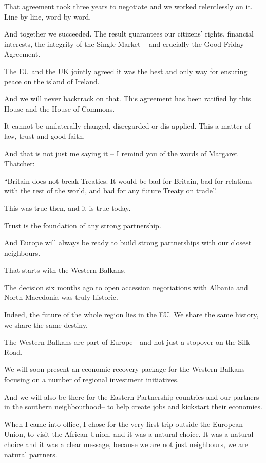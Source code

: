\documentclass[a4paper,11pt]{article}
\begin{document}
That agreement took three years to negotiate and we worked relentlessly on it. Line by line, word by word.

And together we succeeded. The result guarantees our citizens' rights, financial interests, the integrity of the Single Market – and crucially the Good Friday Agreement.

The EU and the UK jointly agreed it was the best and only way for ensuring peace on the island of Ireland.

And we will never backtrack on that. This agreement has been ratified by this House and the House of Commons.

It cannot be unilaterally changed, disregarded or dis-applied. This a matter of law, trust and good faith.

And that is not just me saying it – I remind you of the words of Margaret Thatcher:

“Britain does not break Treaties. It would be bad for Britain, bad for relations with the rest of the world, and bad for any future Treaty on trade”.

This was true then, and it is true today.

Trust is the foundation of any strong partnership.

And Europe will always be ready to build strong partnerships with our closest neighbours. 

That starts with the Western Balkans.

The decision six months ago to open accession negotiations with Albania and North Macedonia was truly historic.

Indeed, the future of the whole region lies in the EU. We share the same history, we share the same destiny.

The Western Balkans are part of Europe - and not just a stopover on the Silk Road. 

We will soon present an economic recovery package for the Western Balkans focusing on a number of regional investment initiatives.

And we will also be there for the Eastern Partnership countries and our partners in the southern neighbourhood– to help create jobs and kickstart their economies.

When I came into office, I chose for the very first trip outside the European Union, to visit the African Union, and it was a natural choice. It was a natural choice and it was a clear message, because we are not just neighbours, we are natural partners.
\end{document}
